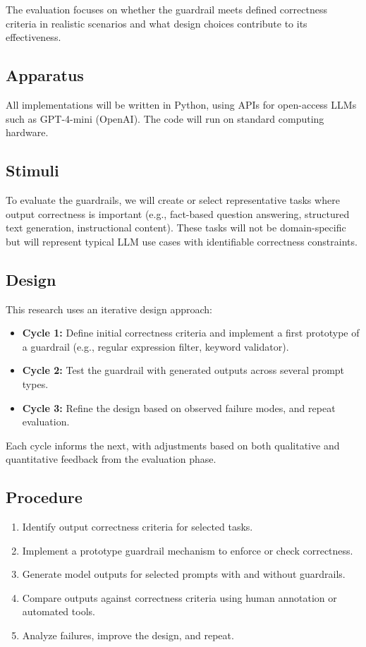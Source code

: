 \documentclass[a4paper,doc,natbib]{apa6}
\begin{document}
    The evaluation focuses on whether the guardrail meets defined correctness criteria in realistic scenarios and what design choices contribute to its effectiveness.

    \subsection{Apparatus}

    All implementations will be written in Python, using APIs for open-access LLMs such as GPT-4-mini (OpenAI). The code will run on standard computing hardware.

    \subsection{Stimuli}

    To evaluate the guardrails, we will create or select representative tasks where output correctness is important (e.g., fact-based question answering, structured text generation, instructional content). These tasks will not be domain-specific but will represent typical LLM use cases with identifiable correctness constraints.

    \subsection{Design}

    This research uses an iterative design approach:
    \begin{itemize}
        \item \textbf{Cycle 1:} Define initial correctness criteria and implement a first prototype of a guardrail (e.g., regular expression filter, keyword validator).
        \item \textbf{Cycle 2:} Test the guardrail with generated outputs across several prompt types.
        \item \textbf{Cycle 3:} Refine the design based on observed failure modes, and repeat evaluation.
    \end{itemize}

    Each cycle informs the next, with adjustments based on both qualitative and quantitative feedback from the evaluation phase.

    \subsection{Procedure}

    \begin{enumerate}
        \item Identify output correctness criteria for selected tasks.
        \item Implement a prototype guardrail mechanism to enforce or check correctness.
        \item Generate model outputs for selected prompts with and without guardrails.
        \item Compare outputs against correctness criteria using human annotation or automated tools.
        \item Analyze failures, improve the design, and repeat.
    \end{enumerate}
\end{document}

